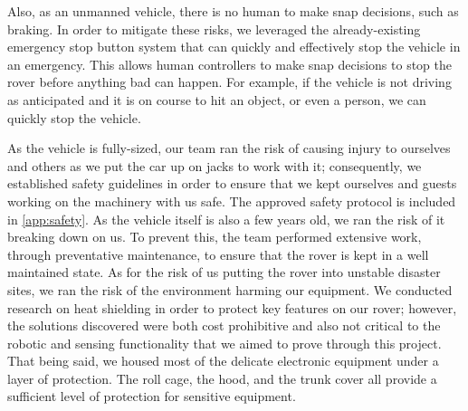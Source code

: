 Also, as an unmanned vehicle, there is no human to make snap decisions, such as braking. In order to mitigate these risks, we leveraged the already-existing emergency stop button system that can quickly and effectively stop the vehicle in an emergency. This allows human controllers to make snap decisions to stop the rover before anything bad can happen. For example, if the vehicle is not driving as anticipated and it is on course to hit an object, or even a person, we can quickly stop the vehicle.

As the vehicle is fully-sized, our team ran the risk of causing injury to ourselves and others as we put the car up on jacks to work with it; consequently, we established safety guidelines in order to ensure that we kept ourselves and guests working on the machinery with us safe. The approved safety protocol is included in \ref{app:safety}. As the vehicle itself is also a few years old, we ran the risk of it breaking down on us. To prevent this, the team performed extensive work, through preventative maintenance, to ensure that the rover is kept in a well maintained state. As for the risk of us putting the rover into unstable disaster sites, we ran the risk of the environment harming our equipment. We conducted research on heat shielding in order to protect key features on our rover; however, the solutions discovered were both cost prohibitive and also not critical to the robotic and sensing functionality that we aimed to prove through this project. That being said, we housed most of the delicate electronic equipment under a layer of protection. The roll cage, the hood, and the trunk cover all provide a sufficient level of protection for sensitive equipment. 


